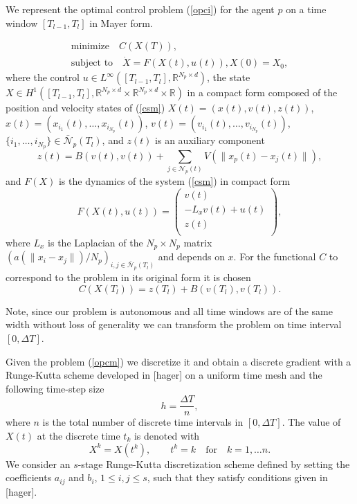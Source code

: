 \documentclass[a4paper,10pt, english]{article}
\newcommand{\D}{\displaystyle}
\begin{document}
 
 We represent the optimal control problem (\ref{opci}) for the agent $p$ on a time window $[T_{l-1}, T_{l}]$ in Mayer form.
  
 \begin{align}
 \D
 \mbox{minimize}\quad  C(X(T)),\\
  \mbox{subject to} \quad \dot{X} = F(X(t), u(t)),
  X(0) = X_0,
 \label{opcm}
 \end{align}
where  the control $u \in  L^{\infty}([T_{l-1}, T_{l}], \mathbb{R}^{N_p \times d})$,
the state $X\in H^1([T_{l-1}, T_{l}], \mathbb{R}^{N_p \times d} \times \mathbb{R}^{N_p\times d} \times \mathbb{R})$
in a compact form composed of the position and velocity 
states of (\ref{csm})   $X(t) = (x(t), v(t), z(t))$, $x(t) = (x_{i_1}(t), \dots, x_{i_{N_p}}(t))$,
 $v(t) = (v_{i_1}(t), \dots, v_{i_{N_p}}(t))$, $\{i_1, \dots, i_{N_p}\} \in \bar{\mathcal{N}}_p(T_l)$, 
 and $z(t)$ is an auxiliary component 
 $$
 z(t) = B(v(t), v(t)) + \sum_{j\in \mathcal{N}_p(t)} V(\|x_p(t) - x_j(t)\|),
 $$
 and $F(X)$ is the dynamics of the system (\ref{csm}) in compact form
 $$
 F(X(t), u(t)) =
  \left( 
  \begin{array}{c}
  v(t)\\
   - L_xv(t) + u(t)\\
   z(t)\\
 \end{array} 
 \right), 
 $$
 where $L_x$ is the Laplacian of the $N_p\times N_p$ matrix $(a(\|x_i - x_j\|)/N_p)_{i, j\in\bar{\mathcal{N}}_p(T_l)}$ and depends on $x$.
 For the functional $C$ to correspond to the problem in its original form it is chosen 
 $$
 C(X(T_l)) = z(T_l) + B(v(T_l), v(T_l)).
 $$
 
  Note, since our problem is autonomous and all time windows are of the same width without loss of generality
 we can transform the problem on time interval $[0, \Delta T]$. 
 
 
  
  Given the problem (\ref{opcm}) we discretize it and obtain a discrete gradient with a Runge-Kutta scheme developed in [hager] on a uniform time mesh and the following time-step size
 \begin{equation}
   h = \frac{\Delta T}{n},
   \label{h}
 \end{equation}
 where $n$ is the total number of discrete time intervals in $[0, \Delta T]$.  The value of $X(t)$ at the discrete time $t_k$ is denoted with
 $$
 X^k = X(t^k), \qquad t^k = k \quad\mbox{for} \quad k = 1, \dots n.
 $$
 We consider an $s$-stage Runge-Kutta discretization scheme defined by setting the coefficients $a_{ij}$ and
 $b_{i}$, $1\leq i, j\leq s$, such that they satisfy conditions given in [hager].
 
\end{document}
